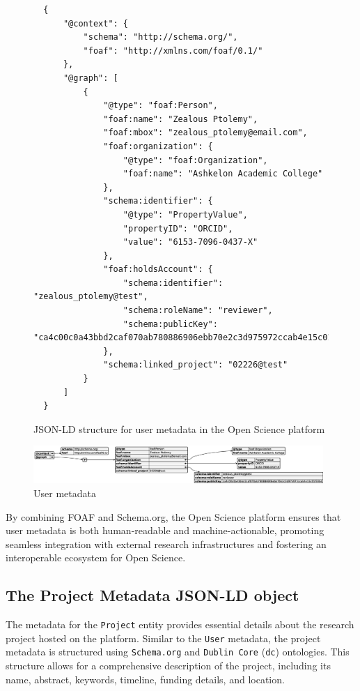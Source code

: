 \documentclass[final]{rc-book-2.14}
\begin{document}
\begin{figure}[h]
    \centering
    \caption{JSON-LD structure for user metadata in the Open Science platform}
    \label{jsonld:user}
    \begin{verbatim}
  {
      "@context": {
          "schema": "http://schema.org/",
          "foaf": "http://xmlns.com/foaf/0.1/"
      },
      "@graph": [
          {
              "@type": "foaf:Person",
              "foaf:name": "Zealous Ptolemy",
              "foaf:mbox": "zealous_ptolemy@email.com",
              "foaf:organization": {
                  "@type": "foaf:Organization",
                  "foaf:name": "Ashkelon Academic College"
              },
              "schema:identifier": {
                  "@type": "PropertyValue",
                  "propertyID": "ORCID",
                  "value": "6153-7096-0437-X"
              },
              "foaf:holdsAccount": {
                  "schema:identifier": "zealous_ptolemy@test",
                  "schema:roleName": "reviewer",
                  "schema:publicKey": "ca4c00c0a43bbd2caf070ab780886906ebb70e2c3d975972ccab4e15c01f33bd"
              },
              "schema:linked_project": "02226@test"
          }
      ]
  }
  \end{verbatim}
\end{figure}


\begin{figure}[htbp]
    \centering
    \includegraphics[width=0.98\textwidth, keepaspectratio]{fig/user_metadata.eps}
    \caption{User metadata}
    \label{fig:user_metadata}
\end{figure}



By combining FOAF and Schema.org, the Open Science platform ensures that user metadata is both human-readable and machine-actionable, promoting seamless integration with external research infrastructures and fostering an interoperable ecosystem for Open Science.

\subsection{The Project Metadata JSON-LD object}

The metadata for the \texttt{Project} entity provides essential details about the research project hosted on the platform. Similar to the \texttt{User} metadata, the project metadata is structured using \texttt{Schema.org} and \texttt{Dublin Core} (\texttt{dc}) ontologies. This structure allows for a comprehensive description of the project, including its name, abstract, keywords, timeline, funding details, and location.
\end{document}
